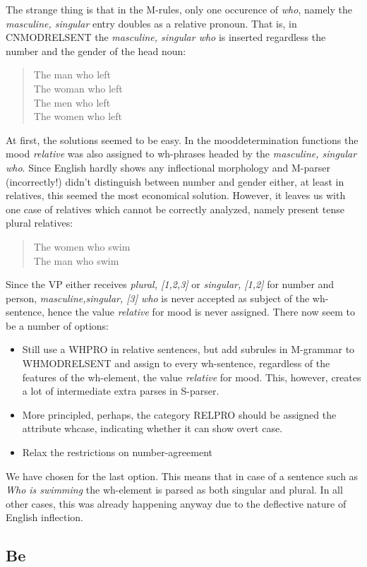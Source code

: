 The strange thing is that in the M-rules, only one occurence of {\em who}, 
namely the {\em masculine, singular} entry doubles as a relative pronoun. That 
is, in CNMODRELSENT the {\em masculine, singular who } is inserted regardless 
the number and the gender of the head noun:
\begin{quote}
The man who left\\
The woman who left\\
The men who left\\
The women who left
\end{quote}
At first, the solutions seemed to be easy. In the mooddetermination functions
the mood {\em relative } was also assigned to wh-phrases headed by the {\em  
masculine, singular who}. Since English hardly shows any inflectional 
morphology and M-parser (incorrectly!) didn't distinguish between number and 
gender either, at least in relatives, this seemed the most economical solution. However, 
it leaves us with one case of relatives which cannot be correctly analyzed, 
namely present tense plural relatives:
\begin{quote}
The women who swim\\
The man who swim
\end{quote}
Since the VP either receives {\em plural, [1,2,3]} or {\em singular, [1,2]} for 
number and person, {\em masculine,singular, [3] who } is never accepted as 
subject of the wh-sentence, hence the value {\em relative } for mood is never 
assigned. There now seem to be a number of options:
\begin{itemize}
  \item Still use a WHPRO in relative sentences, but add subrules in M-grammar 
to WHMODRELSENT and assign to every wh-sentence, regardless of the features of 
the wh-element, the value {\em relative } for mood. This, however, creates a lot 
of intermediate extra parses in S-parser.
  \item More principled, perhaps, the category RELPRO should be assigned the 
attribute whcase, indicating whether it can show overt case. 
  \item Relax the restrictions on number-agreement
\end{itemize}
We have chosen for the last option. This means that in case of a sentence such 
as {\em Who is swimming} the wh-element is parsed as both singular and plural.
In all other cases, this was already happening anyway due to the deflective 
nature of English inflection.
\subsection{Be}
